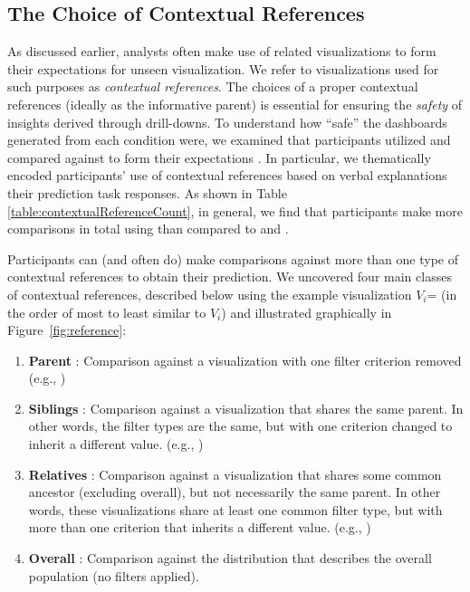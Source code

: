 \subsection{The Choice of Contextual References}
\par As discussed earlier, analysts often make use of related visualizations to form their expectations for unseen visualization. We refer to visualizations used for such purposes as \emph{contextual references}. The choices of a proper contextual references (ideally as the informative parent) is essential for ensuring the \emph{safety} of insights derived through drill-downs. To understand how ``safe'' the dashboards generated from each condition were, we examined  that participants utilized and compared against to form their expectations . In particular, we thematically encoded participants' use of contextual references based on  verbal explanations  their prediction task responses. As shown in Table \ref{table:contextualReferenceCount}, in general, we find that participants make more comparisons in total using \system than compared to \cluster and \BFS.
\par Participants can (and often do) make comparisons against more than one type of contextual references to obtain their prediction. We uncovered four main classes of contextual references, described below using the example visualization $V_i$=\texttt{} (in the order of most to least similar to $V_i$) and illustrated graphically in Figure~\ref{fig:reference}:
\begin{enumerate}
	\item \textbf{Parent} : Comparison against a visualization with one filter criterion removed (e.g., \texttt{})
	\item \textbf{Siblings} : Comparison against a visualization that shares the same parent. In other words, the filter types are the same, but with one criterion changed to inherit a different value. (e.g., \texttt{})
	\item \textbf{Relatives} : Comparison against a visualization that shares some common ancestor (excluding overall), but not necessarily the same parent. In other words, these visualizations share at least one common filter type, but with more than one criterion that inherits a different value. (e.g., \texttt{})
	\item \textbf{Overall} : Comparison against the distribution that describes the overall population (no filters applied).
\end{enumerate}
